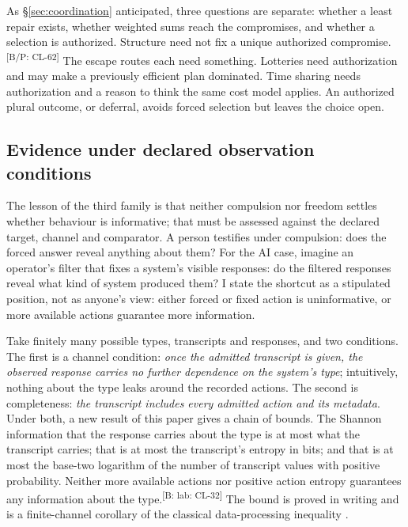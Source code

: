 \documentclass[pdflatex,sn-basic]{sn-jnl}%
\newcommand{\slot}[1]{}%
\newcommand{\claim}[2]{\ifannotated\textsuperscript{\textcolor{blue!60!black}{\tiny[#1: #2]}}\fi}
\begin{document}
As \S\ref{sec:coordination} anticipated, three questions are separate: whether a least repair exists, whether weighted sums reach the compromises, and whether a selection is authorized. Structure need not fix a unique authorized compromise.\claim{B/P}{CL-62} The escape routes each need something. Lotteries need authorization and may make a previously efficient plan dominated. Time sharing needs authorization and a reason to think the same cost model applies. An authorized plural outcome, or deferral, avoids forced selection but leaves the choice open.

\subsection{Evidence under declared observation conditions}\label{sec:evidence}

\slot{5.3}
The lesson of the third family is that neither compulsion nor freedom settles whether behaviour is informative; that must be assessed against the declared target, channel and comparator. A person testifies under compulsion: does the forced answer reveal anything about them? For the AI case, imagine an operator's filter that fixes a system's visible responses: do the filtered responses reveal what kind of system produced them? I state the shortcut as a stipulated position, not as anyone's view: either forced or fixed action is uninformative, or more available actions guarantee more information.

Take finitely many possible types, transcripts and responses, and two conditions. The first is a channel condition: \emph{once the admitted transcript is given, the observed response carries no further dependence on the system's type}; intuitively, nothing about the type leaks around the recorded actions. The second is completeness: \emph{the transcript includes every admitted action and its metadata}. Under both, a new result of this paper gives a chain of bounds. The Shannon information that the response carries about the type is at most what the transcript carries; that is at most the transcript's entropy in bits; and that is at most the base-two logarithm of the number of transcript values with positive probability. Neither more available actions nor positive action entropy guarantees any information about the type.\claim{B: lab}{CL-32} The bound is proved in writing and is a finite-channel corollary of the classical data-processing inequality \citep{cover2005}.
\end{document}
